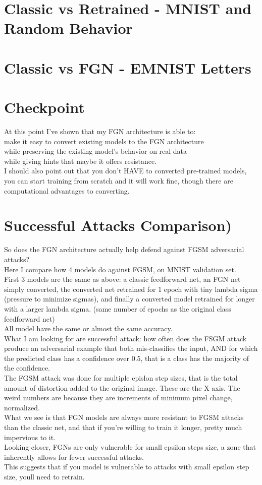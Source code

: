\documentclass{article}
\begin{document}
\section{Classic vs Retrained - MNIST and Random Behavior}

\section{Classic vs FGN - EMNIST Letters}

\section{Checkpoint}
At this point I've shown that my FGN architecture is able to:\\
make it easy to convert existing models to the FGN architecture\\
while preserving the existing model's behavior on real data\\
while giving hints that maybe it offers resistance.\\
I should also point out that you don't HAVE to converted pre-trained models, you can start training from scratch and it will work fine, though there are computational advantages to converting.

\section{Successful Attacks Comparison)}
So does the FGN architecture actually help defend against FGSM adversarial attacks?\\
Here I compare how 4 models do against FGSM, on MNIST validation set.\\
First 3 models are the same as above: a classic feedforward net, an FGN net simply converted, the converted net retrained for 1 epoch with tiny lambda sigma (pressure to minimize sigmas), and finally a converted model retrained for longer with a larger lambda sigma. (same number of epochs as the original class feedforward net)\\
All model have the same or almost the same accuracy.\\
What I am looking for are successful attack: how often does the FSGM attack produce an adversarial example that both mis-classifies the input, AND for which the predicted class has a confidence over 0.5, that is a class has the majority of the confidence.\\
The FGSM attack was done for multiple epislon step sizes, that is the total amount of distortion added to the original image. These are the X axis. The weird numbers are because they are increments of minimum pixel change, normalized.\\
What we see is that FGN models are always more resistant to FGSM attacks than the classic net, and that if you're willing to train it longer, pretty much impervious to it.\\
Looking closer, FGNs are only vulnerable for small epsilon steps size, a zone that inherently allows for fewer successful attacks.\\
This suggests that if you model is vulnerable to attacks with small epsilon step size, youll need to retrain.
\end{document}
